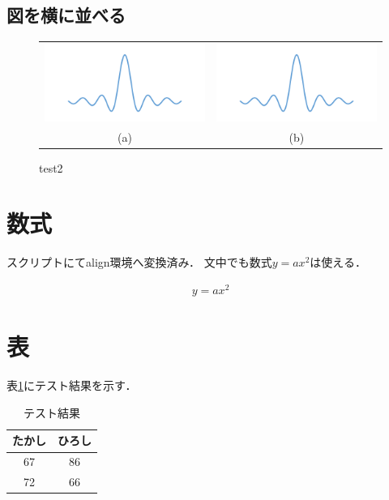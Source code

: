 \subsection{図を横に並べる}\label{ux56f3ux3092ux6a2aux306bux4e26ux3079ux308b}


\begin{figure}[ht]
\centering
\begin{tabular}[]{@{}cc@{}}

\includegraphics[width=8.00000cm]{./fig/sample.png} &
\includegraphics[width=8.00000cm]{./fig/sample.png}\\
(a) & (b)\\

\end{tabular}
\caption{test2}
\end{figure}

\section{数式}\label{ux6570ux5f0f}

スクリプトにてalign環境へ変換済み． 文中でも数式\(y=ax^2\)は使える．

\begin{align}
y=ax^2
\end{align}

\section{表}\label{ux8868}

表\ref{tab:test}にテスト結果を示す．

\begin{table}[ht]
\caption{テスト結果\label{tab:test}}
\centering
\begin{tabular}[]{@{}cc@{}}





\toprule
たかし & ひろし\\
\midrule

67 & 86\\
72 & 66\\
\bottomrule
\end{tabular}

\end{table}

